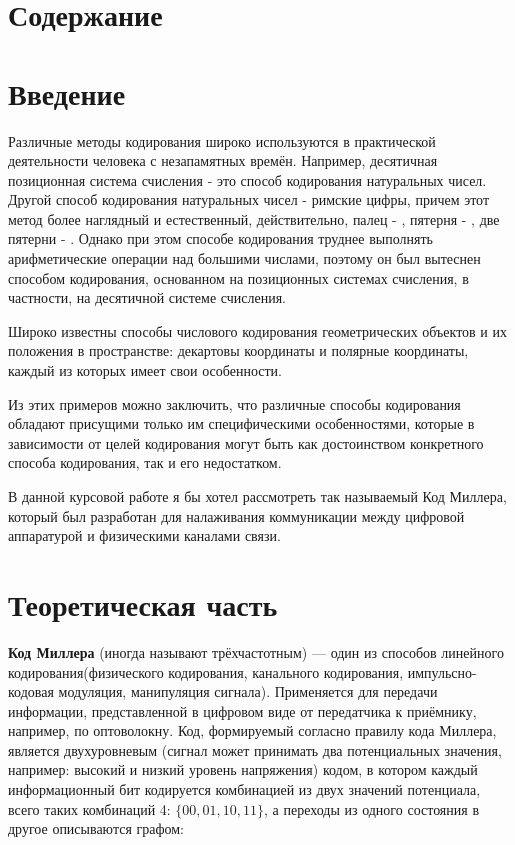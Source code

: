 \documentclass[utf8,14pt,a4paper,oneside,russian]{book}
\makeatletter
\renewcommand{\tableofcontents}{\section*{Содержание}\markboth{Содержание}{}\@starttoc{toc}\newpage}
\newcommand{\RomanNumeralCaps}[1]
{\MakeUppercase{\romannumeral #1}}
\makeatother
\begin{document}
	\tableofcontents
	
	\section{Введение}
	
	Различные методы кодирования широко используются в практической деятельности человека с незапамятных времён. Например, десятичная позиционная система счисления - это способ кодирования натуральных чисел. Другой способ кодирования натуральных	чисел - римские цифры, причем этот метод более наглядный и естественный, действительно, палец - \RomanNumeralCaps{1}, пятерня - \RomanNumeralCaps{5}, две пятерни - \RomanNumeralCaps{10}. Однако при этом способе кодирования труднее выполнять арифметические операции над большими числами, поэтому он был вытеснен способом кодирования, основанном на позиционных системах
	счисления, в частности, на десятичной системе счисления. 
	
	Широко известны способы числового кодирования геометрических объектов и их положения в пространстве: декартовы координаты и полярные координаты, каждый из
	которых имеет свои особенности. 
	
	Из этих примеров можно заключить, что различные способы кодирования обладают
	присущими только им специфическими особенностями, которые в зависимости от целей кодирования могут быть как достоинством конкретного способа кодирования, так и его недостатком.
	
	В данной курсовой работе я бы хотел рассмотреть так называемый Код Миллера, который был разработан для налаживания коммуникации между цифровой аппаратурой и физическими каналами связи.
	
	\newpage
	
	\section{Теоретическая часть}
	\textbf{Код Миллера} (иногда называют трёхчастотным) — один из способов линейного кодирования(физического кодирования, канального кодирования, импульсно-кодовая модуляция, манипуляция сигнала). Применяется для передачи информации, представленной в цифровом виде от передатчика к приёмнику, например, по оптоволокну. Код, формируемый согласно правилу кода Миллера, является двухуровневым (сигнал может принимать два потенциальных значения, например: высокий и низкий уровень напряжения) кодом, в котором каждый информационный бит кодируется комбинацией из двух значений потенциала, всего таких комбинаций 4: $\{00, 01, 10, 11\}$, а переходы из одного состояния в другое описываются графом:
\end{document}
